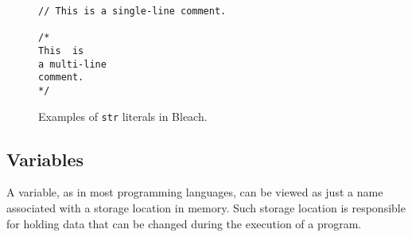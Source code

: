     \begin{figure}[H]
        \centering
        \begin{lstlisting}
// This is a single-line comment.

/*
This  is
a multi-line
comment.
*/
        \end{lstlisting}
        \caption{Examples of \texttt{str} literals in Bleach.}
    \end{figure}

\subsection{Variables}
A variable, as in most programming languages, can be viewed as just a name associated with a storage location in memory. Such storage location is responsible for holding data that can be changed during the execution of a program.

